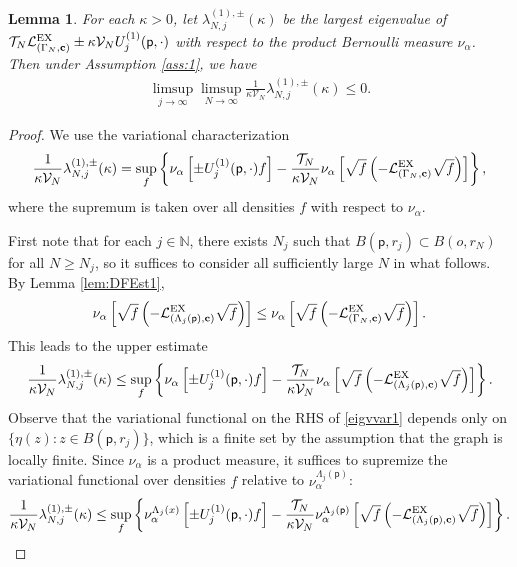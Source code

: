 \documentclass[11pt]{amsart}
\theoremstyle{plain}
\newtheorem{lemma}{Lemma}[section]
\theoremstyle{definition}
\theoremstyle{remark}
\begin{document}
\begin{lemma}
\label{lem:1beigv}
For each $\kappa>0$, let $\lambda^{(1),\pm}_{N,j}(\kappa)$ be the largest eigenvalue of $\mathcal{T}_N \mathcal{L}^{\rm EX}_{(\Gamma_N, {\bf c})} \pm \kappa \mathcal{V}_N {U^{(1)}_{{{j}}}}({\mathsf{p}},\cdot)$ with respect to the product Bernoulli measure $\nu_\alpha$. Then under Assumption \ref{ass:1}, we have
\begin{align}
\label{1beigv}
\limsup_{j\to\infty} \limsup_{N\to\infty} \frac{1}{\kappa \mathcal{V}_N} \lambda^{(1),\pm}_{N,j}(\kappa) \leq 0.
\end{align}
\end{lemma}
\begin{proof}
We use the variational characterization
\begin{equation}
\label{eq:eigvvar}
\frac{1}{\kappa \mathcal{V}_N}\lambda^{(1),\pm}_{N,j}(\kappa) = \sup_f \left\{ \nu_\alpha \left[\pm {U^{(1)}_{{{j}}}}({\mathsf{p}},\cdot) f\right] - \frac{\mathcal{T}_N}{\kappa \mathcal{V}_N} \nu_\alpha \left[\sqrt{f} \left(-\mathcal{L}^{\rm EX}_{(\Gamma_N,{\bf c})} \sqrt{f}\right)\right]\right\},
\end{equation} 
where the supremum is taken over all densities $f$ with respect to $\nu_\alpha$.

First note that for each $j\in \mathbb{N}$, there exists $N_j$ such that $B({\mathsf{p}}, r_j) \subset B(o, r_N)$ for all $N\geq N_j$, so it suffices to consider all sufficiently large $N$ in what follows. By Lemma \ref{lem:DFEst1},
\begin{align*}
\nu_\alpha \left[\sqrt{f}\left(  -\mathcal{L}^{\rm EX}_{(\Lambda_j({\mathsf{p}}),{\bf c})} \sqrt{f} \right) \right] \leq \nu_\alpha \left[\sqrt{f} \left( -\mathcal{L}^{\rm EX}_{(\Gamma_N,{\bf c})} \sqrt{f}\right) \right].
\end{align*}
This leads to the upper estimate
\begin{align}
\label{eigvvar1}
\frac{1}{\kappa \mathcal{V}_N}\lambda^{(1),\pm}_{N,j}(\kappa) \leq \sup_f \left\{ \nu_\alpha \left[\pm {U^{(1)}_{{{j}}}}({\mathsf{p}},\cdot) f\right] - \frac{\mathcal{T}_N}{\kappa \mathcal{V}_N} \nu_\alpha \left[\sqrt{f} \left(-\mathcal{L}^{\rm EX}_{(\Lambda_j({\mathsf{p}}),{\bf c})} \sqrt{f}\right)\right]\right\}.
\end{align} 
Observe that the variational functional on the RHS of \eqref{eigvvar1} depends only on $\{\eta(z): z\in B({\mathsf{p}}, r_j)\}$, which is a finite set by the assumption that the graph is locally finite. Since $\nu_\alpha$ is a product measure, it suffices to supremize the variational functional over densities $f$ relative to $\nu_\alpha^{\Lambda_j({\mathsf{p}})}$:
\begin{align}
\label{1bspecineq}
\frac{1}{\kappa \mathcal{V}_N} \lambda^{(1),\pm}_{N,j}(\kappa) \leq \sup_f \left\{ \nu_\alpha^{\Lambda_j(x)} \left[ \pm{U^{(1)}_{{{j}}}}({\mathsf{p}},\cdot) f\right] - \frac{\mathcal{T}_N}{\kappa \mathcal{V}_N} \nu_\alpha^{\Lambda_j({\mathsf{p}})} \left[\sqrt{f}\left( -\mathcal{L}^{\rm EX}_{(\Lambda_j({\mathsf{p}}),{\bf c})} \sqrt{f}\right)\right]\right\}.
\end{align}


\end{proof}
\end{document}
